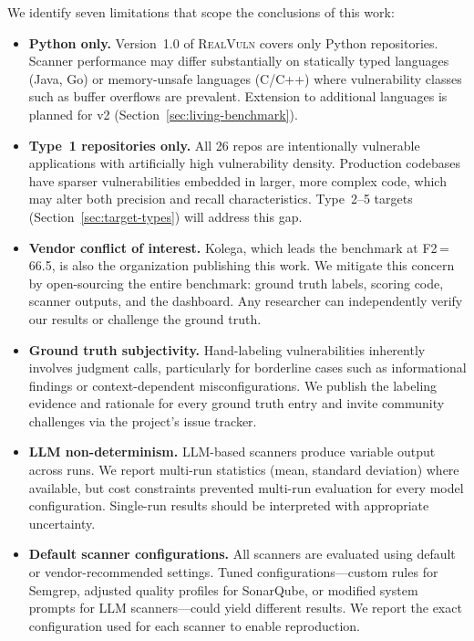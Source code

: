 We identify seven limitations that scope the conclusions of this work:

\begin{itemize}
  \item \textbf{Python only.}
    Version~1.0 of \textsc{RealVuln} covers only Python repositories.
    Scanner performance may differ substantially on statically typed
    languages (Java, Go) or memory-unsafe languages (C/C++) where
    vulnerability classes such as buffer overflows are prevalent.
    Extension to additional languages is planned for v2
    (Section~\ref{sec:living-benchmark}).

  \item \textbf{Type~1 repositories only.}
    All 26 repos are intentionally vulnerable applications with
    artificially high vulnerability density.  Production codebases have
    sparser vulnerabilities embedded in larger, more complex code, which
    may alter both precision and recall characteristics.  Type~2--5
    targets (Section~\ref{sec:target-types}) will address this gap.

  \item \textbf{Vendor conflict of interest.}
    Kolega, which leads the benchmark at F2\,=\,66.5, is also the
    organization publishing this work.  We mitigate this concern by
    open-sourcing the entire benchmark: ground truth labels, scoring
    code, scanner outputs, and the dashboard.  Any researcher can
    independently verify our results or challenge the ground truth.

  \item \textbf{Ground truth subjectivity.}
    Hand-labeling vulnerabilities inherently involves judgment calls,
    particularly for borderline cases such as informational findings or
    context-dependent misconfigurations.  We publish the labeling
    evidence and rationale for every ground truth entry and invite
    community challenges via the project's issue tracker.

  \item \textbf{LLM non-determinism.}
    LLM-based scanners produce variable output across runs.  We report
    multi-run statistics (mean, standard deviation) where available, but
    cost constraints prevented multi-run evaluation for every model
    configuration.  Single-run results should be interpreted with
    appropriate uncertainty.

  \item \textbf{Default scanner configurations.}
    All scanners are evaluated using default or vendor-recommended
    settings.  Tuned configurations---custom rules for Semgrep, adjusted
    quality profiles for SonarQube, or modified system prompts for
    LLM scanners---could yield different results.  We report the exact
    configuration used for each scanner to enable reproduction.


\end{itemize}
